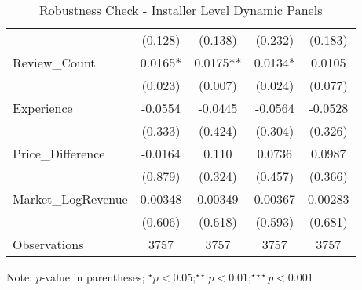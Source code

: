 \begin{table}[H]
\begin{tabular}{@{}lcccc@{}}
	& (0.128)        & (0.138)        & (0.232)        & (0.183)        \\
	Review\_Count                            & 0.0165*        & 0.0175**       & 0.0134*        & 0.0105         \\
	& (0.023)        & (0.007)        & (0.024)        & (0.077)        \\
	Experience                               & -0.0554        & -0.0445        & -0.0564        & -0.0528        \\
	& (0.333)        & (0.424)        & (0.304)        & (0.326)        \\
	Price\_Difference                        & -0.0164        & 0.110          & 0.0736         & 0.0987         \\
	& (0.879)        & (0.324)        & (0.457)        & (0.366)        \\
	Market\_LogRevenue                       & 0.00348        & 0.00349        & 0.00367        & 0.00283        \\
	& (0.606)        & (0.618)        & (0.593)        & (0.681)        \\
	Observations                             & 3757           & 3757           & 3757           & 3757           \\ \bottomrule
\end{tabular}%
\begin{tablenotes}
\item Note: $p$-value in parentheses; $^\star p<0.05;^{\star\star} p<0.01;^{\star\star\star} p<0.001$
\end{tablenotes}
\vspace{10pt}
\caption{Robustness Check - Installer Level Dynamic Panels}
\label{rob_ind_dynamic}
\end{table} 